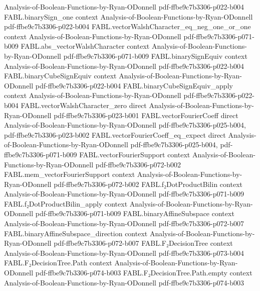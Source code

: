 \begin{theorem}
  {Analysis-of-Boolean-Functions-by-Ryan-ODonnell}
  {pdf-ffbe9c7b3306-p022-b004}
\proofstep
  {FABL.binarySign_one}
  {context}
  {Analysis-of-Boolean-Functions-by-Ryan-ODonnell}
  {pdf-ffbe9c7b3306-p022-b004}
\proofstep
  {FABL.vectorWalshCharacter_eq_neg_one_or_one}
  {context}
  {Analysis-of-Boolean-Functions-by-Ryan-ODonnell}
  {pdf-ffbe9c7b3306-p071-b009}
\proofstep
  {FABL.abs_vectorWalshCharacter}
  {context}
  {Analysis-of-Boolean-Functions-by-Ryan-ODonnell}
  {pdf-ffbe9c7b3306-p071-b009}
\proofstep
  {FABL.binarySignEquiv}
  {context}
  {Analysis-of-Boolean-Functions-by-Ryan-ODonnell}
  {pdf-ffbe9c7b3306-p022-b004}
\proofstep
  {FABL.binaryCubeSignEquiv}
  {context}
  {Analysis-of-Boolean-Functions-by-Ryan-ODonnell}
  {pdf-ffbe9c7b3306-p022-b004}
\proofstep
  {FABL.binaryCubeSignEquiv_apply}
  {context}
  {Analysis-of-Boolean-Functions-by-Ryan-ODonnell}
  {pdf-ffbe9c7b3306-p022-b004}
\proofstep
  {FABL.vectorWalshCharacter_zero}
  {direct}
  {Analysis-of-Boolean-Functions-by-Ryan-ODonnell}
  {pdf-ffbe9c7b3306-p023-b001}
\proofstep
  {FABL.vectorFourierCoeff}
  {direct}
  {Analysis-of-Boolean-Functions-by-Ryan-ODonnell}
  {pdf-ffbe9c7b3306-p025-b004,
    pdf-ffbe9c7b3306-p023-b002}
\proofstep
  {FABL.vectorFourierCoeff_eq_expect}
  {direct}
  {Analysis-of-Boolean-Functions-by-Ryan-ODonnell}
  {pdf-ffbe9c7b3306-p025-b004,
    pdf-ffbe9c7b3306-p071-b009}
\proofstep
  {FABL.vectorFourierSupport}
  {context}
  {Analysis-of-Boolean-Functions-by-Ryan-ODonnell}
  {pdf-ffbe9c7b3306-p072-b002}
\proofstep
  {FABL.mem_vectorFourierSupport}
  {context}
  {Analysis-of-Boolean-Functions-by-Ryan-ODonnell}
  {pdf-ffbe9c7b3306-p072-b002}
\proofstep
  {FABL.f₂DotProductBilin}
  {context}
  {Analysis-of-Boolean-Functions-by-Ryan-ODonnell}
  {pdf-ffbe9c7b3306-p071-b009}
\proofstep
  {FABL.f₂DotProductBilin_apply}
  {context}
  {Analysis-of-Boolean-Functions-by-Ryan-ODonnell}
  {pdf-ffbe9c7b3306-p071-b009}
\proofstep
  {FABL.binaryAffineSubspace}
  {context}
  {Analysis-of-Boolean-Functions-by-Ryan-ODonnell}
  {pdf-ffbe9c7b3306-p072-b007}
\proofstep
  {FABL.binaryAffineSubspace_direction}
  {context}
  {Analysis-of-Boolean-Functions-by-Ryan-ODonnell}
  {pdf-ffbe9c7b3306-p072-b007}
\proofstep
  {FABL.F₂DecisionTree}
  {context}
  {Analysis-of-Boolean-Functions-by-Ryan-ODonnell}
  {pdf-ffbe9c7b3306-p073-b004}
\proofstep
  {FABL.F₂DecisionTree.Path}
  {context}
  {Analysis-of-Boolean-Functions-by-Ryan-ODonnell}
  {pdf-ffbe9c7b3306-p074-b003}
\proofstep
  {FABL.F₂DecisionTree.Path.empty}
  {context}
  {Analysis-of-Boolean-Functions-by-Ryan-ODonnell}
  {pdf-ffbe9c7b3306-p074-b003}

\end{theorem}
